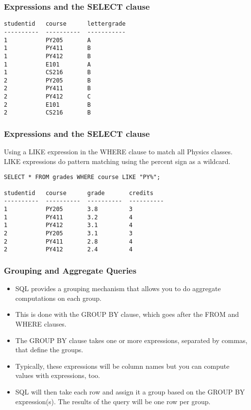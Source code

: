 \begin{frame}[fragile] \frametitle{Expressions and the SELECT clause}
\begin{lstlisting}
studentid   course      lettergrade
----------  ----------  -----------
1           PY205       A          
1           PY411       B          
1           PY412       B          
1           E101        A          
1           CS216       B          
2           PY205       B          
2           PY411       B          
2           PY412       C          
2           E101        B          
2           CS216       B  
\end{lstlisting}
\end{frame}

\begin{frame}[fragile] \frametitle{Expressions and the SELECT clause}
Using a LIKE expression in the WHERE clause to match all Physics classes. LIKE expressions do pattern matching using the percent sign as a wildcard.
\begin{lstlisting}
SELECT * FROM grades WHERE course LIKE "PY%";

studentid   course      grade       credits   
----------  ----------  ----------  ----------
1           PY205       3.8         3         
1           PY411       3.2         4         
1           PY412       3.1         4         
2           PY205       3.1         3         
2           PY411       2.8         4         
2           PY412       2.4         4         
\end{lstlisting}
\end{frame}

\begin{frame}[fragile] \frametitle{Grouping and Aggregate Queries}
\begin{itemize}
\item SQL provides a grouping mechanism that allows you to do aggregate computations on each group. 
\item This is done with the GROUP BY clause, which goes after the FROM and WHERE clauses.
\item The GROUP BY clause takes one or more expressions, separated by commas, that define the groups. 
\item Typically, these expressions will be column names but you can compute values with expressions, too.
\item SQL will then take each row and assign it a group based on the GROUP BY expression(s). The results of the query will be one row per group.
\end{itemize}
\end{frame}

